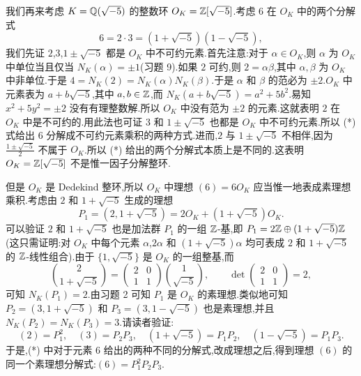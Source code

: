 我们再来考虑 $K=\mathbb{Q}(\sqrt{-5})$ 的整数环 $O_K=\mathbb{Z}[\sqrt{-5}]$.考虑 $6$ 在 $O_K$ 中的两个分解式
\begin{equation}  6=2\cdot 3=(1+\sqrt{-5})(1-\sqrt{-5}),\tag{*}\end{equation}
我们先证 $2$,$3$,$1\pm\sqrt{-5}$ 都是 $O_K$ 中不可约元素.首先注意:对于 $\alpha\in O_K$,则 $\alpha$ 为 $O_K$ 中单位当且仅当 $N_K(\alpha)=\pm 1$(习题 9).如果 $2$ 可约,则 $2=\alpha\beta$,其中 $\alpha,\beta$ 为 $O_K$ 中非单位.于是 $4=N_K(2)=N_K(\alpha)N_K(\beta)$.于是 $\alpha$ 和 $\beta$ 的范必为 $\pm 2$.$O_K$ 中元素表为 $a+b\sqrt{-5}$,其中 $a,b\in\mathbb{Z}$,而 $N_K(a+b\sqrt{-5})=a^2+5b^2$.易知 $x^2+5y^2=\pm 2$ 没有有理整数解.所以 $O_K$ 中没有范为 $\pm 2$ 的元素.这就表明 $2$ 在 $O_K$ 中是不可约的.用此法也可证 $3$ 和 $1\pm\sqrt{-5}$ 也都是 $O_K$ 中不可约元素.所以 (*) 式给出 $6$ 分解成不可约元素乘积的两种方式.进而,$2$ 与 $1\pm\sqrt{-5}$ 不相伴,因为 $\frac{1\pm\sqrt{-5}}{2}$ 不属于 $O_K$.所以 (*) 给出的两个分解式本质上是不同的.这表明 $O_K=\mathbb{Z}[\sqrt{-5}]$ 不是惟一因子分解整环.

但是 $O_K$ 是 Dedekind 整环,所以 $O_K$ 中理想 $(6)=6O_K$ 应当惟一地表成素理想乘积.考虑由 $2$ 和 $1+\sqrt{-5}$ 生成的理想
\[
  P_1=(2,1+\sqrt{-5})=2O_K+(1+\sqrt{-5})O_K.
\]
可以验证 $2$ 和 $1+\sqrt{-5}$ 也是加法群 $P_1$ 的一组 $\mathbb{Z}$-基,即 $P_1=2\mathbb{Z}\oplus(1+\sqrt{-5})\mathbb{Z}$(这只需证明:对 $O_K$ 中每个元素 $\alpha$,$2\alpha$ 和 $(1+\sqrt{-5})\alpha$ 均可表成 $2$ 和 $1+\sqrt{-5}$ 的 $\mathbb{Z}$-线性组合).由于 $\{1,\sqrt{-5}\}$ 是 $O_K$ 的一组整基,而
\[
  \binom{2}{1+\sqrt{-5}}
  =\begin{pmatrix}2&0\\ 1&1\end{pmatrix}\binom{1}{\sqrt{-5}},\qquad
  \det\begin{pmatrix}2&0\\ 1&1\end{pmatrix}=2,
\]
可知 $N_K(P_1)=2$.由习题 2 可知 $P_1$ 是 $O_K$ 的素理想.类似地可知 $P_2=(3,1+\sqrt{-5})$ 和 $P_3=(3,1-\sqrt{-5})$ 也是素理想,并且 $N_K(P_2)=N_K(P_3)=3$.请读者验证:
\[
  (2)=P_1^2,\quad (3)=P_2P_3,\quad (1+\sqrt{-5})=P_1P_2,\quad (1-\sqrt{-5})=P_1P_3.
\]
于是,(*) 中对于元素 $6$ 给出的两种不同的分解式,改成理想之后,得到理想 $(6)$ 的同一个素理想分解式:$(6)=P_1^2P_2P_3$.

